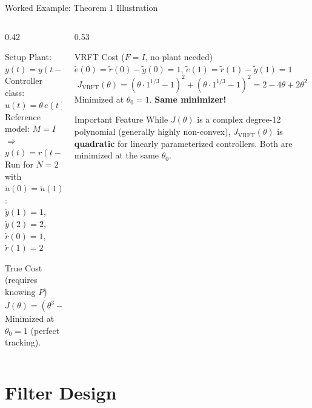 \documentclass[hyperref={pdfpagemode=FullScreen},aspectratio=169]{beamer}
\newcommand{\highlight}[1]{{\color{accentgreen!70!black}\textbf{#1}}}
\newcommand{\JJ}{J_{\mathrm{VRFT}}}
\newcommand{\Jopt}{J}
\begin{document}
\begin{frame}{Worked Example: Theorem 1 Illustration}
  \begin{columns}[T]
    \begin{column}{0.42\textwidth}
      \begin{exampleblock}{Setup}
        Plant: $y(t) = y(t-1) + u(t-1)^3$\\
        Controller class: $u(t) = \theta\, e(t)^{1/3}$\\
        Reference model: $M = I$ \; $\Rightarrow$ $y(t) = r(t-1)$\\[0.4em]
        Run for $N=2$ with $\tilde{u}(0)=\tilde{u}(1)=1$:\\
        $\tilde{y}(1)=1$, $\tilde{y}(2)=2$, $\tilde{r}(0)=1$, $\tilde{r}(1)=2$
      \end{exampleblock}
      \vspace{0.3em}
      \begin{block}{True Cost (requires knowing $P$)}
        \[
          \Jopt(\theta) = (\theta^3-1)^2 + (3\theta^3-\theta^6-2)^2
        \]
        Minimized at $\theta_0 = 1$ (perfect tracking).
      \end{block}
    \end{column}
    \begin{column}{0.53\textwidth}
      \begin{block}{VRFT Cost ($F=I$, no plant needed)}
        $\tilde{e}(0)=\tilde{r}(0)-\tilde{y}(0)=1$, $\tilde{e}(1)=\tilde{r}(1)-\tilde{y}(1)=1$
        \[
          \JJ(\theta) = (\theta \cdot 1^{1/3}-1)^2 + (\theta \cdot 1^{1/3}-1)^2 = 2-4\theta+2\theta^2
        \]
        Minimized at $\theta_0 = 1$. \highlight{Same minimizer!}
      \end{block}
      \vspace{0.3em}
      \begin{alertblock}{Important Feature}
        While $\Jopt(\theta)$ is a complex degree-12 polynomial (generally highly non-convex), $\JJ(\theta)$ is \highlight{quadratic} for linearly parameterized controllers. Both are minimized at the same $\theta_0$.
      \end{alertblock}
    \end{column}
  \end{columns}
\end{frame}

\section{Filter Design}
\end{document}
